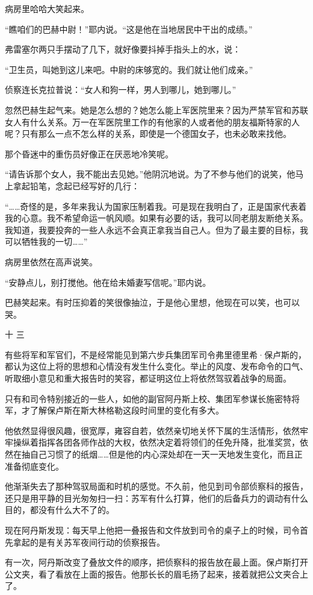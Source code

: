 病房里哈哈大笑起来。

“瞧咱们的巴赫中尉！”耶内说。“这是他在当地居民中干出的成绩。”

弗雷塞尔两只手摆动了几下，就好像要抖掉手指头上的水，说：

“卫生员，叫她到这儿来吧。中尉的床够宽的。我们就让他们成亲。”

侦察连长克拉普说：“女人和狗一样，男人到哪儿，她到哪儿。”

忽然巴赫生起气来。她是怎么想的？她怎么能上军医院里来？因为严禁军官和苏联女人有什么关系。万一在军医院里工作的有他家的人或者他的朋友福斯特家的人呢？只有那么一点不怎么样的关系，即使是一个德国女子，也未必敢来找他。

那个昏迷中的重伤员好像正在厌恶地冷笑呢。

“请告诉那个女人，我不能出去见她。”他阴沉地说。为了不参与他们的说笑，他马上拿起铅笔，念起已经写好的几行：

“……奇怪的是，多年来我认为国家压制着我。可是现在我明白了，正是国家代表着我的心意。我不希望命运一帆风顺。如果有必要的话，我可以同老朋友断绝关系。我知道，我要投奔的一些人永远不会真正拿我当自己人。但为了最主要的目标，我可以牺牲我的一切……”

病房里依然在高声说笑。

“安静点儿，别打搅他。他在给未婚妻写信呢。”耶内说。

巴赫笑起来。有时压抑着的笑很像抽泣，于是他心里想，他现在可以笑，也可以哭。

十 三

有些将军和军官们，不是经常能见到第六步兵集团军司令弗里德里希·保卢斯的，都认为这位上将的思想和心情没有发生什么变化。举止的风度、发布命令的口气、听取细小意见和重大报告时的笑容，都证明这位上将依然驾驭着战争的局面。

只有和司令特别接近的一些人，如他的副官阿丹斯上校、集团军参谋长施密特将军，才了解保卢斯在斯大林格勒这段时间里的变化有多大。

他依然显得很风趣，很宽厚，雍容自若，依然亲切地关怀下属的生活情形，依然牢牢操纵着指挥各团各师作战的大权，依然决定着将领们的任免升降，批准奖赏，依然在抽自己习惯了的纸烟……但是他的内心深处却在一天一天地发生变化，而且正准备彻底变化。

他渐渐失去了那种驾驭局面和时机的感觉。不久前，他见到司令部侦察科的报告，还只是用平静的目光匆匆扫一扫：苏军有什么打算，他们的后备兵力的调动有什么目的，都没有什么大不了的。

现在阿丹斯发现：每天早上他把一叠报告和文件放到司令的桌子上的时候，司令首先拿起的是有关苏军夜间行动的侦察报告。

有一次，阿丹斯改变了叠放文件的顺序，把侦察科的报告放在最上面。保卢斯打开公文夹，看了看放在上面的报告。他那长长的眉毛扬了起来，接着就把公文夹合上了。

